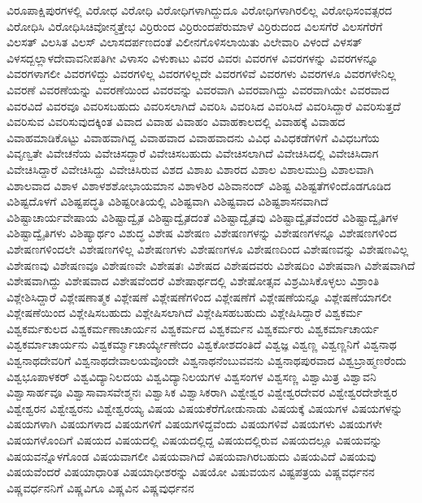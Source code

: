 {ವಿರೂಪಾಕ್ಷಿಪುರಗಳಲ್ಲಿ
ವಿರೋಧ
ವಿರೋಧಿ
ವಿರೋಧಿಗಳಾಗಿದ್ದುದೂ
ವಿರೋಧಿಗಳಾಗಿರಲಿಲ್ಲ
ವಿರೋಧಿಸಂವತ್ಸರದ
ವಿರೋಧಿಸಿ
ವಿರೋಧಿಸಿಚಿವೋನ್ಮತ್ತೇಭ
ವಿರ್ರಿರುಂದ
ವಿರ್ರಿರುಂದಪೆರುಮಾಳೆ
ವಿರ್ರಿರುದಂದ
ವಿಲಸಗೆರೆ
ವಿಲಸಗೆರೆಗೆ
ವಿಲಸತ್
ವಿಲಸಿತ
ವಿಲಸ್
ವಿಲಾಸದರ್ಪಣದಂತೆ
ವಿಲೀನಗೊಳಿಸಲಾಯಿತು
ವಿಲೇವಾರಿ
ವಿಳಂದೆ
ವಿಳಸತ್
ವಿಳಸದ್ಬಲ್ಲಾಳದೇವಾವನೀಪತಿಗೀ
ವಿಳಾಸಂ
ವಿಳುಕಾಟು
ವಿವರ
ವಿವರಃ
ವಿವರಗಳ
ವಿವರಗಳನ್ನು
ವಿವರಗಳನ್ನೂ
ವಿವರಗಳಾಗಲೀ
ವಿವರಗಳಿದ್ದು
ವಿವರಗಳಿಲ್ಲ
ವಿವರಗಳಿಲ್ಲದೇ
ವಿವರಗಳಿವೆ
ವಿವರಗಳು
ವಿವರಗಳೂ
ವಿವರಗಳೇನಿಲ್ಲ
ವಿವರಣೆ
ವಿವರಣೆಯನ್ನು
ವಿವರಣೆಯಿಂದ
ವಿವರವನ್ನು
ವಿವರವಾಗಿ
ವಿವರವಾಗಿದ್ದು
ವಿವರವಾಗಿಯೇ
ವಿವರವಾದ
ವಿವರವಿದೆ
ವಿವರವೂ
ವಿವರಿಸಬಹುದು
ವಿವರಿಸಲಾಗಿದೆ
ವಿವರಿಸಿ
ವಿವರಿಸಿದ
ವಿವರಿಸಿದೆ
ವಿವರಿಸಿದ್ದಾರೆ
ವಿವರಿಸುತ್ತದೆ
ವಿವರಿಸುವ
ವಿವರಿಸುವುದಕ್ಕಿಂತ
ವಿವಾದ
ವಿವಾಹ
ವಿವಾಹಂ
ವಿವಾಹಕಾಲದಲ್ಲಿ
ವಿವಾಹಕ್ಕೆ
ವಿವಾಹದ
ವಿವಾಹಮಾಡಿಕೊಟ್ಟು
ವಿವಾಹವಾಗಿದ್ದ
ವಿವಾಹವಾದ
ವಿವಾಹವಾದನು
ವಿವಿಧ
ವಿವಿಧಕಡೆಗಳಿಗೆ
ವಿವಿಧಬಗೆಯ
ವಿವೃಣ್ವತೇ
ವಿವೇಚನೆಯ
ವಿವೇಚಿಸದ್ದಾರೆ
ವಿವೇಚಿಸಬಹುದು
ವಿವೇಚಿಸಲಾಗಿದೆ
ವಿವೇಚಿಸಿದಲ್ಲಿ
ವಿವೇಚಿಸಿದಾಗ
ವಿವೇಚಿಸಿದ್ದಾರೆ
ವಿವೇಚಿಸಿದ್ದು
ವಿವೇಚಿಸಿರುವ
ವಿಶದ
ವಿಶಾಖ
ವಿಶಾರದ
ವಿಶಾಲ
ವಿಶಾಲಮುದ್ರಿ
ವಿಶಾಲವಾಗಿ
ವಿಶಾಲವಾದ
ವಿಶಾಳ
ವಿಶಾಳಶಶೋಭಾಯಮಾನ
ವಿಶಾಳಶಿರ
ವಿಶಿವಾನಂದ್
ವಿಶಿಷ್ಟ
ವಿಶಿಷ್ಟತೆಗಳಿಂದೊಡಗೂಡಿದ
ವಿಶಿಷ್ಟದೊಳಗೆ
ವಿಶಿಷ್ಟಪದ್ಧತಿ
ವಿಶಿಷ್ಟರೀತಿಯಲ್ಲಿ
ವಿಶಿಷ್ಟವಾಗಿ
ವಿಶಿಷ್ಟವಾದ
ವಿಶಿಷ್ಟಶಾಸನವಾಗಿದೆ
ವಿಶಿಷ್ಟಾಚಾರ್ಯವೇಷಾಯ
ವಿಶಿಷ್ಟಾದ್ವೈತ
ವಿಶಿಷ್ಟಾದ್ವೈತದಂತೆ
ವಿಶಿಷ್ಟಾದ್ವೈತವು
ವಿಶಿಷ್ಟಾದ್ವೈತವೆಂದರೆ
ವಿಶಿಷ್ಟಾದ್ವೈತಿಗಳ
ವಿಶಿಷ್ಟಾದ್ವೈತಿಗಳು
ವಿಶಿಷ್ಯಾರ್ಥಂ
ವಿಶುದ್ಧ
ವಿಶೇಷ
ವಿಶೇಷಣ
ವಿಶೇಷಣಗಳನ್ನು
ವಿಶೇಷಣಗಳನ್ನೂ
ವಿಶೇಷಣಗಳಿಂದ
ವಿಶೇಷಣಗಳಿಂದಲೇ
ವಿಶೇಷಣಗಳಿಲ್ಲ
ವಿಶೇಷಣಗಳು
ವಿಶೇಷಣಗಳೂ
ವಿಶೇಷಣದಿಂದ
ವಿಶೇಷಣವನ್ನು
ವಿಶೇಷಣವಿಲ್ಲ
ವಿಶೇಷಣವು
ವಿಶೇಷಣವೂ
ವಿಶೇಷಣವೇ
ವಿಶೇಷತಃ
ವಿಶೇಷದ
ವಿಶೇಷದವರು
ವಿಶೇಷದಿಂ
ವಿಶೇಷವಾಗಿ
ವಿಶೇಷವಾಗಿದೆ
ವಿಶೇಷವಾಗಿದ್ದು
ವಿಶೇಷವಾದ
ವಿಶೇಷವೆಂದರೆ
ವಿಶೇಷಾರ್ಥದಲ್ಲಿ
ವಿಶೇಷೋತ್ಸವ
ವಿಶ್ರಮಿಸಿಕೊಳ್ಳಲು
ವಿಶ್ರಾಂತಿ
ವಿಶ್ಲೇಶಿಸಿದ್ದಾರೆ
ವಿಶ್ಲೇಷಣಾತ್ಮಕ
ವಿಶ್ಲೇಷಣೆ
ವಿಶ್ಲೇಷಣೆಗಳಿಂದ
ವಿಶ್ಲೇಷಣೆಗೆ
ವಿಶ್ಲೇಷಣೆಯನ್ನೂ
ವಿಶ್ಲೇಷಣೆಯಾಗಲೀ
ವಿಶ್ಲೇಷಣೆಯಿಂದ
ವಿಶ್ಲೇಷಿಸಬಹುದು
ವಿಶ್ಲೇಷಿಸಲಾಗಿದೆ
ವಿಶ್ಲೇಷಿಸಹಬಹುದು
ವಿಶ್ಲೇಷಿಸಿದ್ದಾರೆ
ವಿಶ್ವಕರ್ಮ
ವಿಶ್ವಕರ್ಮಕುಲದ
ವಿಶ್ವಕರ್ಮಣಾಚಾರ್ಯನ
ವಿಶ್ವಕರ್ಮದ
ವಿಶ್ವಕರ್ಮನ
ವಿಶ್ವಕರ್ಮರು
ವಿಶ್ವಕರ್ಮಾಚಾರ್ಯ
ವಿಶ್ವಕರ್ಮಾಚಾರ್ಯನು
ವಿಶ್ವಕರ್ಮ್ಮಾಚಾರ್ಯ್ಯೇಣೇದಂ
ವಿಶ್ವಕೋಶದಂತಿದೆ
ವಿಶ್ವಜ್ಞ
ವಿಶ್ವಣ್ಣ
ವಿಶ್ವಣ್ಣನಿಗೆ
ವಿಶ್ವನಾಥ
ವಿಶ್ವನಾಥದೇವರಿಗೆ
ವಿಶ್ವನಾಥದೇವಾಲಯವೊಂದೇ
ವಿಶ್ವನಾಥನೆಂಬುವವನು
ವಿಶ್ವನಾಥಪುರವಾದ
ವಿಶ್ವಬ್ರಾಹ್ಮಣರೆಂದು
ವಿಶ್ವಭೂಪಾಳಕರ್
ವಿಶ್ವವಿದ್ಯಾನಿಲದಯ
ವಿಶ್ವವಿದ್ಯಾನಿಲಯಗಳ
ವಿಶ್ವಸಂಗಳ
ವಿಶ್ವಸಣ್ಣ
ವಿಶ್ವಾಮಿತ್ರ
ವಿಶ್ವಾವನಿ
ವಿಶ್ವಾಸಾರ್ಹವೂ
ವಿಶ್ವಾಸಾವಾಸವೇಶ್ಮನಃ
ವಿಶ್ವಾಸಿಕ
ವಿಶ್ವಾಸಿಕರಾಗಿ
ವಿಶ್ವೇಶ್ವರ
ವಿಶ್ವೇಶ್ವರದೇವರ
ವಿಶ್ವೇಶ್ವರದೇಶೇಶ್ವರ
ವಿಶ್ವೇಶ್ವರನ
ವಿಶ್ವೇಶ್ವರನು
ವಿಶ್ವೇಶ್ವರಯ್ಯ
ವಿಷಯ
ವಿಷಯಕೆರೆಗೋಡುನಾಡು
ವಿಷಯಕ್ಕೆ
ವಿಷಯಗಳ
ವಿಷಯಗಳನ್ನು
ವಿಷಯಗಳಾಗಿ
ವಿಷಯಗಳಾದ
ವಿಷಯಗಳಿಗೆ
ವಿಷಯಗಳಿದ್ದವೆಂದು
ವಿಷಯಗಳಿವೆ
ವಿಷಯಗಳು
ವಿಷಯಗಳೇ
ವಿಷಯಗಳೊಂದಿಗೆ
ವಿಷಯದ
ವಿಷಯದಲ್ಲಿ
ವಿಷಯದಲ್ಲಿದ್ದ
ವಿಷಯದಲ್ಲಿರುವ
ವಿಷಯದಲ್ಲೂ
ವಿಷಯವನ್ನು
ವಿಷಯವನ್ನೊಳಗೊಂಡ
ವಿಷಯವಾಗಲೀ
ವಿಷಯವಾಗಿದೆ
ವಿಷಯವಾಗಿರಬಹುದು
ವಿಷಯವಿದೆ
ವಿಷಯವು
ವಿಷಯವೆಂದರೆ
ವಿಷಯಾಧಾರಿತ
ವಿಷಯಾಧೀಶರನ್ನು
ವಿಷಯೋ
ವಿಷುವಯನ
ವಿಷ್ಟಪತ್ರಯ
ವಿಷ್ಣವರ್ಧನನ
ವಿಷ್ಣವರ್ಧನನಿಗೆ
ವಿಷ್ಣವಿಗೂ
ವಿಷ್ಣವಿನ
ವಿಷ್ಣವುರ್ಧನನ
}

